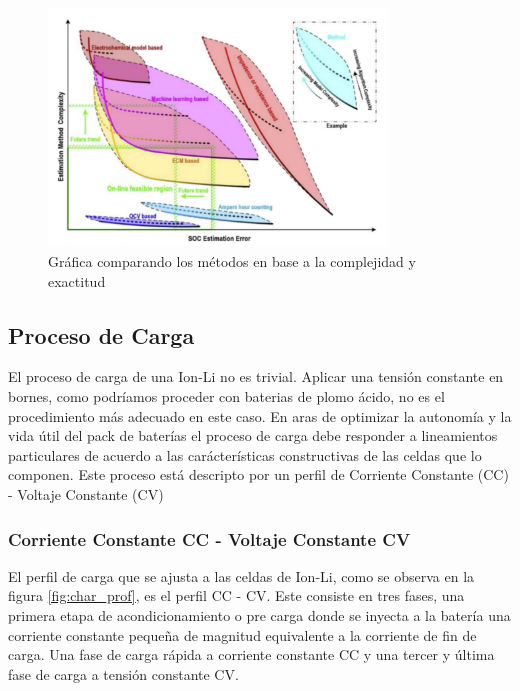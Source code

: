 \documentclass[10pt,a4paper]{article}
\begin{document}
\begin{figure}[h!]
    \begin{center}
        \includegraphics[width=0.8\textwidth]{comparisson_soc.png}
        \caption{Gr\'afica comparando los m\'etodos en base a la complejidad y
        exactitud}
        \label{comp_error_soc}
    \end{center}
\end{figure}

\subsection{Proceso de Carga}\label{sec:tecnica_carga}

El proceso de carga de una \acrfull{Ion-Li} no es trivial. Aplicar una tensión
constante en  bornes, como podríamos proceder con baterias de plomo ácido, no es
el procedimiento más adecuado en este caso. En aras de optimizar la autonomía y
la vida útil del pack de baterías el proceso de carga debe responder a
lineamientos particulares de acuerdo a las carácterísticas constructivas de las
celdas que lo componen. Este proceso est\'a descripto por un perfil de Corriente
Constante (CC) - Voltaje Constante (CV)

\subsubsection{Corriente Constante CC - Voltaje Constante CV}

El perfil de carga que se ajusta a las celdas de \acrshort{Ion-Li}, como se
observa en la figura \ref{fig:char_prof}, es el perfil \acrshort{CC} -
\acrshort{CV}. Este consiste en tres fases, una primera etapa de
acondicionamiento o pre carga donde se inyecta a la batería una corriente
constante pequeña de magnitud equivalente a la corriente de fin de carga. Una
fase de carga rápida a corriente constante \acrshort{CC} y una tercer y última
fase de carga a tensión constante \acrshort{CV}.
\end{document}
